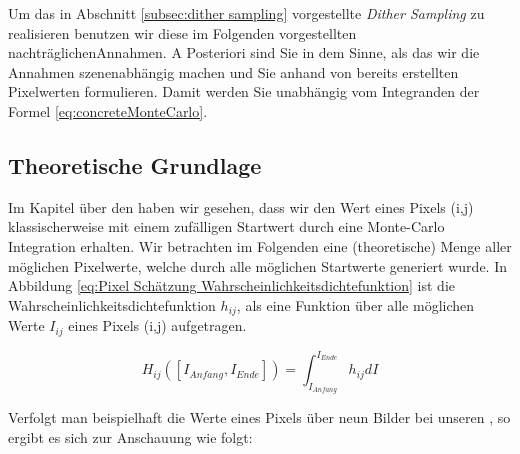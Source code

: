 Um das in Abschnitt \ref{subsec:dither sampling} vorgestellte \textit{Dither Sampling} zu realisieren
benutzen wir diese im Folgenden vorgestellten \glqq nachträglichen\grqq Annahmen. 
A Posteriori sind Sie in dem Sinne, als das wir die Annahmen szenenabhängig machen und Sie anhand 
von bereits erstellten Pixelwerten formulieren. Damit werden Sie unabhängig vom Integranden der Formel 
\ref{eq:concreteMonteCarlo}.

\subsection{Theoretische Grundlage}

Im Kapitel über den  haben wir gesehen, dass 
wir den Wert eines Pixels (i,j) klassischerweise mit einem zufälligen
Startwert durch eine Monte-Carlo Integration erhalten. Wir betrachten im
Folgenden eine (theoretische) Menge aller möglichen Pixelwerte, welche durch alle möglichen Startwerte generiert wurde.
In Abbildung \ref{eq:Pixel Schätzung Wahrscheinlichkeitsdichtefunktion} ist die Wahrscheinlichkeitsdichtefunktion
$h_{ij}$, als eine Funktion über alle möglichen Werte $I_{ij}$ eines Pixels (i,j) aufgetragen.

\begin{tcolorbox}[rightrule=3mm, rounded corners=east]
    \begin{equation}\label{eq:Pixel Schätzung Wahrscheinlichkeitsdichtefunktion}
        H_{ij}([I_{Anfang},I_{Ende}]) = \int_{I_{Anfang}}^{I_{Ende}} h_{ij} dI
    \end{equation}
\end{tcolorbox}

Verfolgt man beispielhaft die Werte eines Pixels über neun Bilder bei unseren , 
so ergibt es sich zur Anschauung wie folgt:

